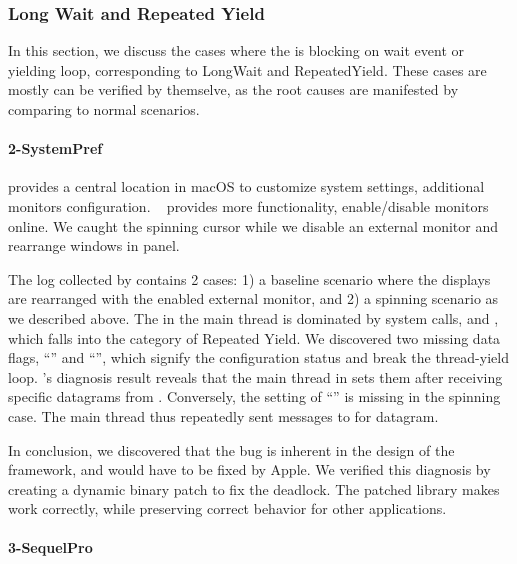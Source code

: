 \subsubsection{Long Wait and Repeated Yield}

In this section, we discuss the cases where the \spinningnode is blocking on
wait event or yielding loop, corresponding to LongWait and RepeatedYield.
These cases are mostly can be verified by themselve, as the root causes are
manifested by comparing to normal scenarios.

\paragraph{2-SystemPref}

 provides a central location in macOS to customize system
settings, \eg additional monitors configuration.
~\cite{disablemonitor} provides more functionality, \eg
enable/disable monitors online. We caught the spinning cursor while we disable
an external monitor and rearrange windows in  panel.

The log collected by \xxx contains 2 cases: 1) a baseline scenario where the
displays are rearranged with the enabled external monitor, and 2) a spinning
scenario as we described above. The \spinningnode in the main thread is dominated
by system calls,  and , which falls into the
category of Repeated Yield. We discovered two missing data flags,
``'' and ``'', which
signify the configuration status and break the thread-yield loop. 
\xxx's diagnosis result reveals that the main thread in  sets
them after receiving specific datagrams from . Conversely, the
setting of ``'' is missing in the spinning case.
The main thread thus repeatedly sent messages to  for datagram.

In conclusion, we discovered that the bug is inherent in the design of the
 framework, and would have to be fixed by Apple. We verified this
diagnosis by creating a dynamic binary patch to fix the deadlock. The
patched library makes  work correctly, while preserving correct
behavior for other applications.

\paragraph{3-SequelPro}

